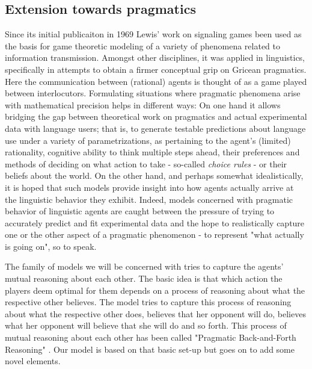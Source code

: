 \documentclass{article}
\begin{document}
\subsection{Extension towards pragmatics}
Since its initial publicaiton in 1969 Lewis' work on signaling games been used as the basis for game theoretic modeling of a variety of phenomena related to information transmission. Amongst other disciplines, it was applied in linguistics, specifically in attempts to obtain a firmer conceptual grip on Gricean pragmatics. Here the communication between (rational) agents is thought of as a game played between interlocutors. Formulating situations where pragmatic phenomena arise with mathematical precision helps in different ways: On one hand it allows bridging the gap between theoretical work on pragmatics and actual experimental data with language users; that is, to generate testable predictions about language use under a variety of parametrizations, as pertaining to the agent's (limited) rationality, cognitive ability to think multiple steps ahead, their preferences and methods of deciding on what action to take - so-called \textit{choice rules} - or their beliefs about the world. On the other hand, and perhaps somewhat idealistically, it is hoped that such models provide insight into how agents actually arrive at the linguistic behavior they exhibit. Indeed, models concerned with pragmatic behavior of linguistic agents are caught between the pressure of trying to accurately predict and fit experimental data and the hope to realistically capture one or the other aspect of a pragmatic phenomenon - to represent "what actually is going on", so to speak.

The family of models we will be concerned with tries to capture the agents' mutual reasoning about each other. The basic idea is that which action the players deem optimal for them depends on a process of reasoning about what the respective other believes. The model tries to capture this process of reasoning about what the respective other does, believes that her opponent will do, believes what her opponent will believe that she will do and so forth. This process of mutual reasoning about each other has been called "Pragmatic Back-and-Forth Reasoning" \cite{franke2014pragmatic}. Our model is based on that basic set-up but goes on to add some novel elements.
\end{document}
